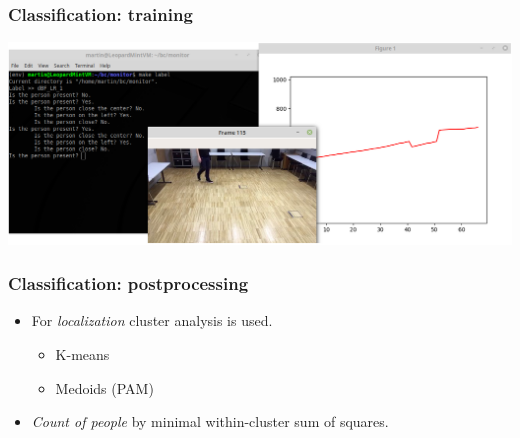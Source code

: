 \documentclass[10pt,xcolor=pdflatex]{beamer}
\begin{document}
\begin{frame}\frametitle{Classification: training}
    \begin{center}
        \includegraphics[width=1\textwidth]{img/labelling.png}
    \end{center}
\end{frame}

\begin{frame}\frametitle{Classification: postprocessing}
    \begin{itemize}
        \item For \emph{localization} cluster analysis is used.
            \begin{itemize}
                \item K-means
                \item Medoids (PAM)
            \end{itemize}
        \item \emph{Count of people} by minimal within-cluster sum of squares.
    \end{itemize}
\end{frame}
\end{document}
